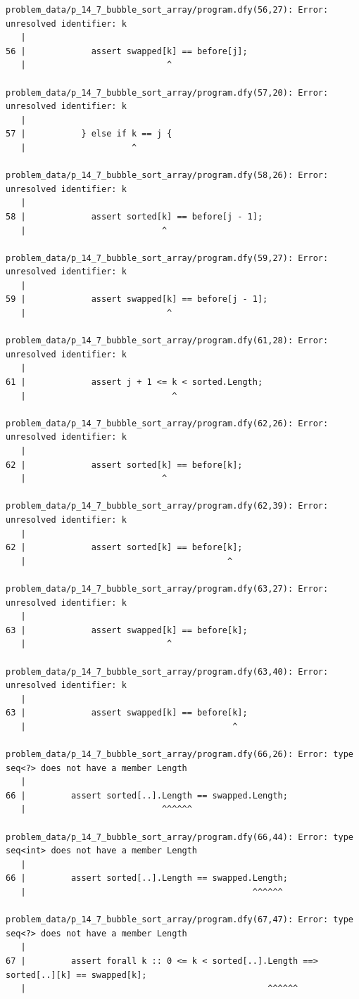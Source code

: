 \documentclass{article}
\begin{document}
\begin{lstlisting}
problem_data/p_14_7_bubble_sort_array/program.dfy(56,27): Error: unresolved identifier: k
   |
56 |             assert swapped[k] == before[j];
   |                            ^

problem_data/p_14_7_bubble_sort_array/program.dfy(57,20): Error: unresolved identifier: k
   |
57 |           } else if k == j {
   |                     ^

problem_data/p_14_7_bubble_sort_array/program.dfy(58,26): Error: unresolved identifier: k
   |
58 |             assert sorted[k] == before[j - 1];
   |                           ^

problem_data/p_14_7_bubble_sort_array/program.dfy(59,27): Error: unresolved identifier: k
   |
59 |             assert swapped[k] == before[j - 1];
   |                            ^

problem_data/p_14_7_bubble_sort_array/program.dfy(61,28): Error: unresolved identifier: k
   |
61 |             assert j + 1 <= k < sorted.Length;
   |                             ^

problem_data/p_14_7_bubble_sort_array/program.dfy(62,26): Error: unresolved identifier: k
   |
62 |             assert sorted[k] == before[k];
   |                           ^

problem_data/p_14_7_bubble_sort_array/program.dfy(62,39): Error: unresolved identifier: k
   |
62 |             assert sorted[k] == before[k];
   |                                        ^

problem_data/p_14_7_bubble_sort_array/program.dfy(63,27): Error: unresolved identifier: k
   |
63 |             assert swapped[k] == before[k];
   |                            ^

problem_data/p_14_7_bubble_sort_array/program.dfy(63,40): Error: unresolved identifier: k
   |
63 |             assert swapped[k] == before[k];
   |                                         ^

problem_data/p_14_7_bubble_sort_array/program.dfy(66,26): Error: type seq<?> does not have a member Length
   |
66 |         assert sorted[..].Length == swapped.Length;
   |                           ^^^^^^

problem_data/p_14_7_bubble_sort_array/program.dfy(66,44): Error: type seq<int> does not have a member Length
   |
66 |         assert sorted[..].Length == swapped.Length;
   |                                             ^^^^^^

problem_data/p_14_7_bubble_sort_array/program.dfy(67,47): Error: type seq<?> does not have a member Length
   |
67 |         assert forall k :: 0 <= k < sorted[..].Length ==> sorted[..][k] == swapped[k];
   |                                                ^^^^^^


\end{lstlisting}
\end{document}
